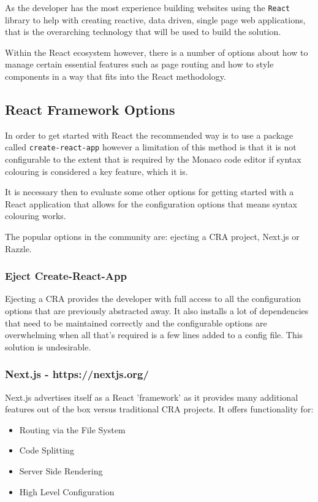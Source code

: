 As the developer has the most experience building websites using the \texttt{React} library \cite{react} to help with creating reactive, data driven, single page web applications, that is the overarching technology that will be used to build the solution.

Within the React ecosystem however, there is a number of options about how to manage certain essential features such as page routing and how to style components in a way that fits into the React methodology.

\subsection{React Framework Options}

In order to get started with React the recommended way is to use a package called \texttt{create-react-app} however a limitation of this method is that it is not configurable to the extent that is required by the Monaco code editor if syntax colouring is considered a key feature, which it is.

It is necessary then to evaluate some other options for getting started with a React application that allows for the configuration options that means syntax colouring works.

The popular options in the community are: ejecting a CRA project, Next.js or Razzle.

\subsubsection{Eject Create-React-App}
Ejecting a CRA provides the developer with full access to all the configuration options that are previously abstracted away. It also installs a lot of dependencies that need to be maintained correctly and the configurable options are overwhelming when all that's required is a few lines added to a config file. This solution is undesirable.

\subsubsection{Next.js - https://nextjs.org/}
Next.js advertises itself as a React 'framework' as it provides many additional features out of the box versus traditional CRA projects. It offers functionality for:

\begin{itemize}
  \item Routing via the File System
  \item Code Splitting
  \item Server Side Rendering
  \item High Level Configuration
\end{itemize}

